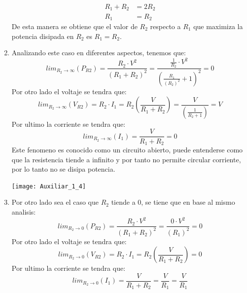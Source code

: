 \documentclass[
  11pt,
  letterpaper,
   addpoints,
  ]{exam}
\begin{document}
\begin{questions}
\begin{solution}
\begin{enumerate}
\begin{align}
                R_{1} + R_{2} &= 2R_{2}\\
                R_{1} &= R_{2}
            \end{align}
            De esta manera se obtiene que el valor de $R_{2}$ respecto a $R_{1}$ que maximiza la potencia disipada en $R_{2}$ es $R_{1} = R_{2}$.
            \item Analizando este caso en diferentes aspectos, tenemos que:
            \begin{equation}
                lim_{R_{2} \to \infty} (P_{R2}) = \frac{R_{2} \cdot V^{2}}{(R_{1} + R_{2})^{2}} = \frac{\frac{1}{R_{2}} \cdot V^{2}}{(\frac{R_{1}}{(R_{2})^{2}} + 1)^{2}} = 0
            \end{equation}
            Por otro lado el voltaje se tendra que:
            \begin{equation}
                lim_{R_{2} \to \infty} (V_{R2}) = R_{2} \cdot I_{1} = R_{2}\left( \frac{V}{R_{1} + R_{2}} \right) = \frac{V}{\left( \frac{1}{R_{2}+1}\right)} = V
            \end{equation}
        Por ultimo la corriente se tendra que:
        \begin{equation}
            lim_{R_{2} \to \infty} (I_{1}) = \frac{V}{R_{1} + R_{2}} = 0
        \end{equation}
        Este fenomeno es conocido como un circuito abierto, puede entenderse como que la resistencia tiende a infinito y por tanto no permite circular corriente, por lo tanto no se disipa potencia.
        \begin{center}
            \texttt{[image: Auxiliar\_1\_4]}
        \end{center}
        \item Por otro lado sea el caso que $R_{2}$ tiende a 0, se tiene que en base al mismo analisis:
        \begin{equation}
            lim_{R_{2} \to 0} (P_{R2}) = \frac{R_{2} \cdot V^{2}}{(R_{1} + R_{2})^{2}} = \frac{0 \cdot V^{2}}{(R_{1})^{2}} = 0
        \end{equation}
        Por otro lado el voltaje se tendra que:
        \begin{equation}
            lim_{R_{2} \to 0} (V_{R2}) = R_{2} \cdot I_{1} = R_{2}\left( \frac{V}{R_{1} + R_{2}} \right) = 0
        \end{equation}
        Por ultimo la corriente se tendra que:
        \begin{equation}
            lim_{R_{2} \to 0} (I_{1}) = \frac{V}{R_{1} + R_{2}} = \frac{V}{R_{1}} = \frac{V}{R_{1}}

\end{equation}
\end{enumerate}
\end{solution}
\end{questions}
\end{document}
